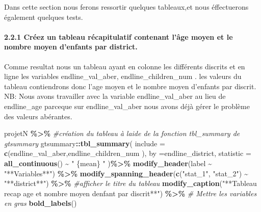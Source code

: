 \documentclass[
]{article}
\newenvironment{Shaded}{\begin{snugshade}}{\end{snugshade}}
\newcommand{\AttributeTok}[1]{\textcolor[rgb]{0.13,0.29,0.53}{#1}}
\newcommand{\CommentTok}[1]{\textcolor[rgb]{0.56,0.35,0.01}{\textit{#1}}}
\newcommand{\FunctionTok}[1]{\textcolor[rgb]{0.13,0.29,0.53}{\textbf{#1}}}
\newcommand{\NormalTok}[1]{#1}
\newcommand{\SpecialCharTok}[1]{\textcolor[rgb]{0.81,0.36,0.00}{\textbf{#1}}}
\newcommand{\StringTok}[1]{\textcolor[rgb]{0.31,0.60,0.02}{#1}}
\begin{document}
Dans cette section nous ferons ressortir quelques tableaux,et nous
éffectuerons également quelques tests.

\hypertarget{cruxe9ez-un-tableau-ruxe9capitulatif-contenant-luxe2ge-moyen-et-le-nombre-moyen-denfants-par-district.}{%
\paragraph{2.2.1 Créez un tableau récapitulatif contenant l'âge moyen et
le nombre moyen d'enfants par
district.}\label{cruxe9ez-un-tableau-ruxe9capitulatif-contenant-luxe2ge-moyen-et-le-nombre-moyen-denfants-par-district.}}

Comme resultat nous un tableau ayant en colonne les différents discrits
et en ligne les variables endline\_val\_aber, endline\_children\_num .
les valeurs du tableau contiendrons donc l'age moyen et le nombre moyen
d'enfants par discrit. NB: Nous avons travailler avec la variable
endline\_val\_aber au lieu de endline\_age parceque sur
endline\_val\_aber nous avons déjà gérer le problème des valeurs
abérantes.

\begin{Shaded}
\begin{Highlighting}[]
\NormalTok{projetN }\SpecialCharTok{\%\textgreater{}\%}
  \CommentTok{\#création du tableau à l\textquotesingle{}aide de la fonction tbl\_summary de gtsummary}
\NormalTok{  gtsummary}\SpecialCharTok{::}\FunctionTok{tbl\_summary}\NormalTok{(}
    \AttributeTok{include =} \FunctionTok{c}\NormalTok{(endline\_val\_aber,endline\_children\_num ),}
    \AttributeTok{by =}\NormalTok{endline\_district,}
    \AttributeTok{statistic =} \FunctionTok{all\_continuous}\NormalTok{() }\SpecialCharTok{\textasciitilde{}} \StringTok{" \{mean\} "}
\NormalTok{  )}\SpecialCharTok{\%\textgreater{}\%}
  \FunctionTok{modify\_header}\NormalTok{(label }\SpecialCharTok{\textasciitilde{}} \StringTok{"**Variables**"}\NormalTok{) }\SpecialCharTok{\%\textgreater{}\%}
  \FunctionTok{modify\_spanning\_header}\NormalTok{(}\FunctionTok{c}\NormalTok{(}\StringTok{"stat\_1"}\NormalTok{, }\StringTok{"stat\_2"}\NormalTok{) }\SpecialCharTok{\textasciitilde{}} \StringTok{"**district**"}\NormalTok{) }\SpecialCharTok{\%\textgreater{}\%}
  \CommentTok{\#afficher le titre du tableau}
  \FunctionTok{modify\_caption}\NormalTok{(}\StringTok{"**Tableau recap age et nombre moyen d\textquotesingle{}\textquotesingle{}enfant par discrit**"}\NormalTok{) }\SpecialCharTok{\%\textgreater{}\%}
  \CommentTok{\# Mettre les variables en gras}
  \FunctionTok{bold\_labels}\NormalTok{()}
\end{Highlighting}
\end{Shaded}
\end{document}
